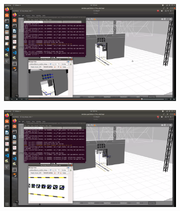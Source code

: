 \documentclass[../Head/report.tex]{subfiles}
\begin{document}
\begin{figure}[H]
\begin{subfigure}[t]{.30\textwidth}
        \caption{}
        \label{fig:gps2vision_navigate_to_board}
    \end{subfigure}
         \hspace{0.2em}
    \begin{subfigure}[t]{.30\textwidth}
        \centering
        \includegraphics[width=\textwidth]{../Figures/GPS2Vision/drone_gps2vision_transition.png}
        \caption{}
        \label{fig:gps2vision_gps2vision_transition}
    \end{subfigure}
         \hspace{0.2em}
    \begin{subfigure}[t]{.30\textwidth}
        \centering
        \includegraphics[width=\textwidth]{../Figures/GPS2Vision/drone_vision_navigation.png}
        \caption{}
        \label{fig:gps2vision_vision_navigation}
    \end{subfigure}
    \caption{}
    \label{fig:gps2vision_states}
\end{figure}
\end{document}
